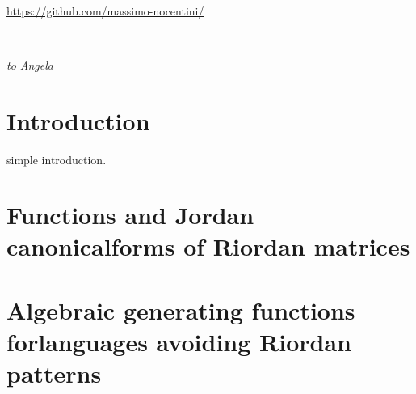 \documentclass[a4paper,twoside,symmetric]{tufte-book}
\newcommand{\monthyear}{%
  \ifcase\month\or January\or February\or March\or April\or May\or June\or
  July\or August\or September\or October\or November\or
  December\fi\space\number\year
}
\begin{document}
\fi

\cleardoublepage
\begin{fullwidth}
~\vfill
\thispagestyle{empty}
\setlength{\parindent}{0pt}
\setlength{\parskip}{\baselineskip}

\par{\url{https://github.com/massimo-nocentini/}}
\end{fullwidth}

\tableofcontents


\listoftables

\cleardoublepage
~\vfill
\begin{doublespace}
\noindent\fontsize{18}{22}\selectfont\itshape
\nohyphenation
to \mbox{Angela}
\end{doublespace}
\vfill
\vfill


\cleardoublepage
\chapter*{Introduction}

simple introduction.




\chapter{Functions and Jordan canonical\newline forms of Riordan matrices}
\label{ch:Riordan-matrices-function}



\chapter{Algebraic generating functions for\newline languages avoiding Riordan patterns}
\label{ch:algebraic-gfs-languages-avoiding-Riordan-patterns}


\end{document}
